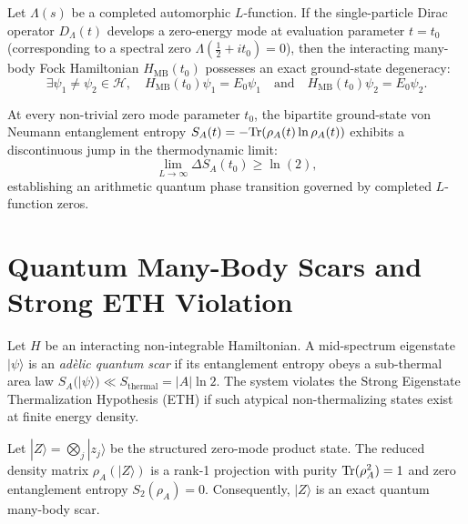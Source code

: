 \begin{theorem}
\label{thm:zero_mode_degeneracy}
\leanok
Let $\Lambda(s)$ be a completed automorphic $L$-function. If the single-particle Dirac operator $D_{\Lambda}(t)$ develops a zero-energy mode at evaluation parameter $t = t_0$ (corresponding to a spectral zero $\Lambda(\frac{1}{2} + i t_0) = 0$), then the interacting many-body Fock Hamiltonian $H_{\mathrm{MB}}(t_0)$ possesses an exact ground-state degeneracy:
\[
\exists \psi_1 \neq \psi_2 \in \mathcal{H}, \quad H_{\mathrm{MB}}(t_0) \psi_1 = E_0 \psi_1 \quad \text{and} \quad H_{\mathrm{MB}}(t_0) \psi_2 = E_0 \psi_2.
\]
\end{theorem}

\begin{theorem}
\label{thm:entanglement_phase_transition}
\leanok
At every non-trivial zero mode parameter $t_0$, the bipartite ground-state von Neumann entanglement entropy $S_A(t) = -\mathrm{Tr}(\rho_A(t) \ln \rho_A(t))$ exhibits a discontinuous jump in the thermodynamic limit:
\[
\lim_{L \to \infty} \Delta S_A(t_0) \ge \ln(2),
\]
establishing an arithmetic quantum phase transition governed by completed $L$-function zeros.
\end{theorem}

\section{Quantum Many-Body Scars and Strong ETH Violation}

\begin{definition}
\label{def:quantum_scar_state}
\leanok
Let $H$ be an interacting non-integrable Hamiltonian. A mid-spectrum eigenstate $|\psi\rangle$ is an \emph{adèlic quantum scar} if its entanglement entropy obeys a sub-thermal area law $S_A(|\psi\rangle) \ll S_{\mathrm{thermal}} = |A| \ln 2$. The system violates the Strong Eigenstate Thermalization Hypothesis (ETH) if such atypical non-thermalizing states exist at finite energy density.
\end{definition}

\begin{theorem}
\label{thm:adelic_scar_protection}
\leanok
Let $|Z\rangle = \bigotimes_{j} |z_j\rangle$ be the structured zero-mode product state. The reduced density matrix $\rho_A(|Z\rangle)$ is a rank-1 projection with purity $\mathrm{Tr}(\rho_A^2) = 1$ and zero entanglement entropy $S_2(\rho_A) = 0$. Consequently, $|Z\rangle$ is an exact quantum many-body scar.
\end{theorem}

